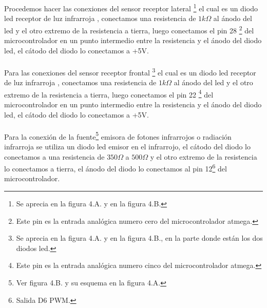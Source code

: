 \documentclass[12]{article}
\begin{document}
\begin{multicols}{2}
Procedemos hacer las conexiones del sensor receptor lateral \footnote{Se aprecia en la figura 4.A. y en la figura 4.B.} el cual es un diodo led receptor de luz infrarroja \cite{INFRARED}, conectamos una resistencia de $1 k\Omega$ al ánodo del led y el otro extremo de la resistencia a tierra, luego conectamos el pin 28 \footnote{Este pin es la entrada analógica numero cero del microcontrolador atmega.} del microcontrolador en un punto intermedio entre la resistencia y el ánodo del diodo led, el cátodo del diodo lo conectamos a +5V.\\\\
Para las conexiones del sensor receptor frontal \footnote{Se aprecia en la figura 4.A. y en la figura 4.B., en la parte donde están los dos diodos led.} el cual es un diodo led receptor de luz infrarroja \cite{INFRARED}, conectamos una resistencia de $1 k\Omega$ al ánodo del led y el otro extremo de la resistencia a tierra, luego conectamos el pin 22 \footnote{Este pin es la entrada analógica numero cinco del microcontrolador atmega.} del microcontrolador en un punto intermedio entre la resistencia y el ánodo del diodo led, el cátodo del diodo lo conectamos a +5V.\\\\
Para la conexión de la fuente\footnote{Ver figura 4.B. y su esquema en la figura 4.A.} emisora de fotones infrarrojos o radiación infrarroja se utiliza un diodo led emisor en el infrarrojo, el cátodo del diodo lo conectamos a una resistencia de $350 \Omega$ a $500 \Omega$ y el otro extremo de la resistencia lo conectamos a tierra, el ánodo del diodo lo conectamos al pin 12\footnote{Salida D6 PWM.} del microcontrolador.


\end{multicols}
\end{document}
